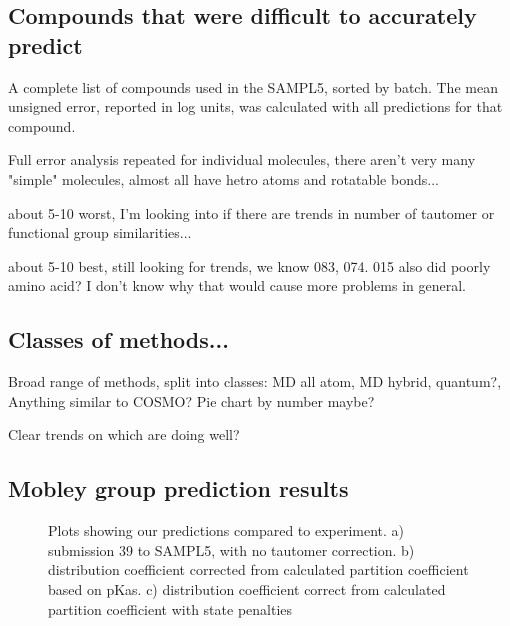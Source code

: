 \subsection{Compounds that were difficult to accurately predict}

\label{results:4}
\begin{table}

\label{MoleculeTable}
\caption{A complete list of compounds used in the SAMPL5, sorted by batch. The mean unsigned error, reported in log units, was calculated with all predictions for that compound.} 
\end{table}

Full error analysis repeated for individual molecules, there aren't very many "simple" molecules, almost all have hetro atoms and rotatable bonds...

about 5-10 worst, I'm looking into if there are trends in number of tautomer or functional group similarities...

about 5-10 best, still looking for trends, we know 083, 074. 015 also did poorly amino acid? I don't know why that would cause more problems in general. 


\subsection{Classes of methods...}
\label{results:5}
Broad range of methods, split into classes: MD all atom, MD hybrid, quantum?, Anything similar to COSMO? %
Pie chart by number maybe?

Clear trends on which are doing well? 

\subsection{Mobley group prediction results}
\label{results:6}

\begin{figure}
\caption{Plots showing our predictions compared to experiment. a) submission 39 to SAMPL5, with no tautomer correction. b) distribution coefficient corrected from calculated partition coefficient based on pKas. c) distribution coefficient correct from calculated partition coefficient with state penalties }
\label{myComparisons}       %
\end{figure}

